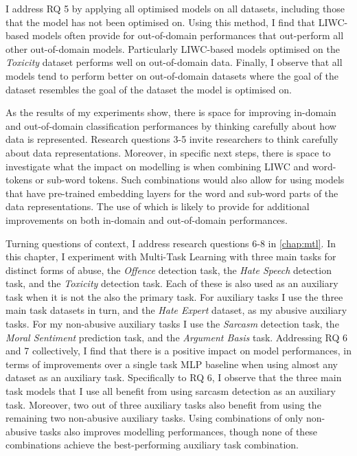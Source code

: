 I address RQ 5 by applying all optimised models on all datasets, including those that the model has not been optimised on.
Using this method, I find that LIWC-based models often provide for out-of-domain performances that out-perform all other out-of-domain models.
Particularly LIWC-based models optimised on the \textit{Toxicity} dataset performs well on out-of-domain data.
Finally, I observe that all models tend to perform better on out-of-domain datasets where the goal of the dataset resembles the goal of the dataset the model is optimised on.

As the results of my experiments show, there is space for improving in-domain and out-of-domain classification performances by thinking carefully about how data is represented.
Research questions 3-5 invite researchers to think carefully about data representations.
Moreover, in specific next steps, there is space to investigate what the impact on modelling is when combining LIWC and word-tokens or sub-word tokens.
Such combinations would also allow for using models that have pre-trained embedding layers for the word and sub-word parts of the data representations.
The use of which is likely to provide for additional improvements on both in-domain and out-of-domain performances.

Turning questions of context, I address research questions $6$-$8$ in \cref{chap:mtl}.
In this chapter, I experiment with Multi-Task Learning with three main tasks for distinct forms of abuse, the \textit{Offence} detection task, the \textit{Hate Speech} detection task, and the \textit{Toxicity} detection task.
Each of these is also used as an auxiliary task when it is not the also the primary task.
For auxiliary tasks I use the three main task datasets in turn, and the \textit{Hate Expert} dataset, as my abusive auxiliary tasks.
For my non-abusive auxiliary tasks I use the \textit{Sarcasm} detection task, the \textit{Moral Sentiment} prediction task, and the \textit{Argument Basis} task.
Addressing RQ 6 and 7 collectively, I find that there is a positive impact on model performances, in terms of improvements over a single task MLP baseline when using almost any dataset as an auxiliary task.
Specifically to RQ 6, I observe that the three main task models that I use all benefit from using sarcasm detection as an auxiliary task.
Moreover, two out of three auxiliary tasks also benefit from using the remaining two non-abusive auxiliary tasks.
Using combinations of only non-abusive tasks also improves modelling performances, though none of these combinations achieve the best-performing auxiliary task combination.


